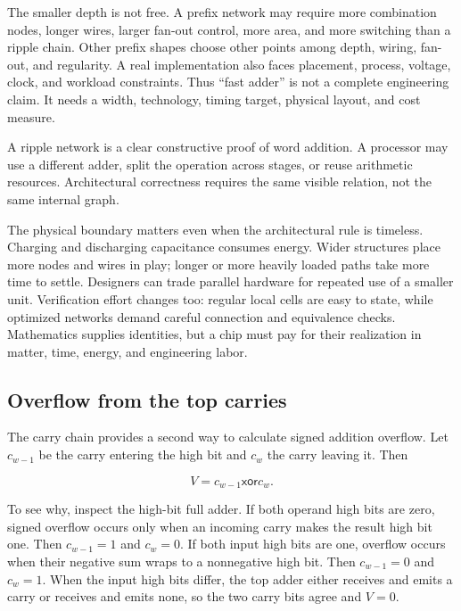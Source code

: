 The smaller depth is not free. A prefix network may require more combination
nodes, longer wires, larger fan-out control, more area, and more switching than
a ripple chain. Other prefix shapes choose other points among depth, wiring,
fan-out, and regularity. A real implementation also faces placement, process,
voltage, clock, and workload constraints. Thus ``fast adder'' is not a complete
engineering claim. It needs a width, technology, timing target, physical
layout, and cost measure.

\begin{warning}[title={The proof circuit need not be the processor circuit}]
A ripple network is a clear constructive proof of word addition. A processor
may use a different adder, split the operation across stages, or reuse
arithmetic resources. Architectural correctness requires the same visible
relation, not the same internal graph.
\end{warning}

The physical boundary matters even when the architectural rule is timeless.
Charging and discharging capacitance consumes energy. Wider structures place
more nodes and wires in play; longer or more heavily loaded paths take more
time to settle. Designers can trade parallel hardware for repeated use of a
smaller unit. Verification effort changes too: regular local cells are easy to
state, while optimized networks demand careful connection and equivalence
checks. Mathematics supplies identities, but a chip must pay for their
realization in matter, time, energy, and engineering labor.

\subsection{Overflow from the top carries}

The carry chain provides a second way to calculate signed addition overflow.
Let \(c_{w-1}\) be the carry entering the high bit and \(c_w\) the carry leaving
it. Then

\[
  V=c_{w-1}\mathbin{\mathsf{xor}}c_w.
\]

To see why, inspect the high-bit full adder. If both operand high bits are zero,
signed overflow occurs only when an incoming carry makes the result high bit
one. Then \(c_{w-1}=1\) and \(c_w=0\). If both input high bits are one,
overflow occurs when their negative sum wraps to a nonnegative high bit. Then
\(c_{w-1}=0\) and \(c_w=1\). When the input high bits differ, the top adder
either receives and emits a carry or receives and emits none, so the two carry
bits agree and \(V=0\).

